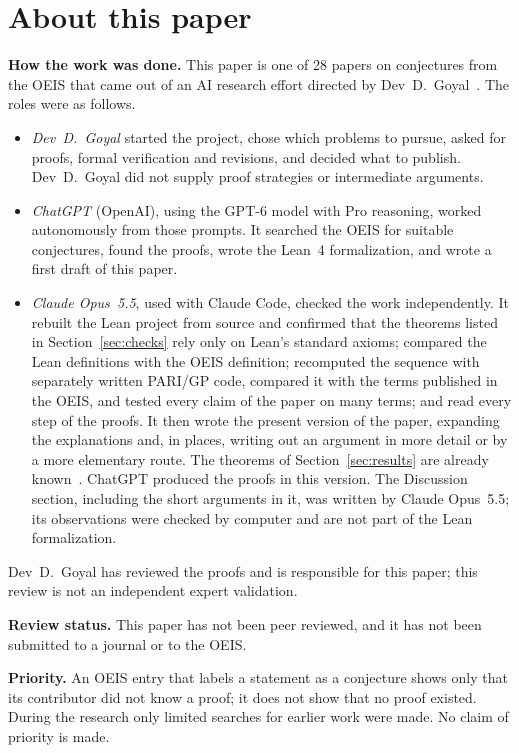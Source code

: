 \documentclass[11pt,a4paper]{article}
\theoremstyle{definition}
\theoremstyle{remark}
\newcommand{\para}[1]{\par\medskip\noindent\textbf{#1}\enspace}
\begin{document}
\section*{About this paper}\label{sec:about}
\para{How the work was done.}
This paper is one of 28 papers on conjectures from the OEIS that came out of an AI research effort directed by
Dev~D.~Goyal~\cite{repo}. The roles were as follows.
\begin{itemize}
\item \emph{Dev~D.~Goyal} started the project, chose which problems to pursue, asked for proofs, formal verification and
revisions, and decided what to publish. Dev~D.~Goyal did not supply proof strategies or intermediate arguments.
\item \emph{ChatGPT} (OpenAI), using the GPT-6 model with Pro reasoning, worked autonomously from those prompts. It
searched the OEIS for suitable conjectures, found the proofs, wrote the Lean~4 formalization, and wrote a first draft
of this paper.
\item \emph{Claude Opus~5.5}, used with Claude Code, checked the work independently. It rebuilt the Lean project from source and confirmed that the theorems listed in Section~\ref{sec:checks} rely only on
Lean's standard axioms; compared the Lean definitions with the OEIS definition; recomputed the sequence with separately
written PARI/GP code, compared it with the terms published in the OEIS, and tested every claim of the paper on many
terms; and read every step of the proofs. It then wrote the present version of the paper, expanding the
explanations and, in places, writing out an argument in more detail or by a more elementary route. The theorems of
Section~\ref{sec:results} are already known~\cite{prior}. ChatGPT produced the proofs in this version. The Discussion section, including the short arguments
in it, was written by Claude Opus~5.5; its observations were checked by computer and are not part of the Lean
formalization.
\end{itemize}
Dev~D.~Goyal has reviewed the proofs and is responsible for this paper; this review is not an independent expert
validation.

\para{Review status.} This paper has not been peer reviewed, and it has not been submitted to a journal or to the OEIS.

\para{Priority.} An OEIS entry that labels a statement as a conjecture shows only that its contributor did not know
a proof; it does not show that no proof existed. During the research only limited searches for earlier work were
made. No claim of priority is made.
\end{document}
